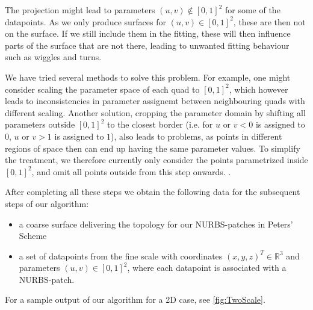 The projection might lead to parameters $\left(u,v\right)\not\in\left[0,1\right]^2$ for some of the datapoints. As we only produce surfaces for $\left(u,v\right)\in\left[0,1\right]^2$, these are then not on the surface. If we still include them in the fitting, these will then influence parts of the surface that are not there, leading to unwanted fitting behaviour such as wiggles and turns. 

We have tried several methods to solve this problem. For example, one might consider scaling the parameter space of each quad to $\left[0,1\right]^2$, which however leads to inconsistencies in parameter assignemt between neighbouring quads with different scaling. Another solution, cropping the parameter domain by shifting all parameters outside $\left[0,1\right]^2$ to the closest border (i.e. for $u \text{ or } v < 0$ is assigned to $0$, $u \text{ or } v >1$ is assigned to $1$), also leads to problems, as points in different regions of space then can end up having the same parameter values. To simplify the treatment, we therefore currently only consider the points parametrized inside $\left[0,1\right]^2$, and omit all points outside from this step onwards. .

After completing all these steps we obtain the following data for the subsequent steps of our algorithm:
\begin{itemize}
\item a coarse surface delivering the topology for our \ac{NURBS}-patches in Peters' Scheme
\item a set of datapoints from the fine scale with coordinates $\left(x,y,z\right)^T\in\mathbb{R}^3$ and parameters $\left(u,v\right)\in\left[0,1\right]^2$, where each datapoint is associated with a \ac{NURBS}-patch. 
\end{itemize}
For a sample output of our algorithm for a 2D case, see \autoref{fig:TwoScale}.

